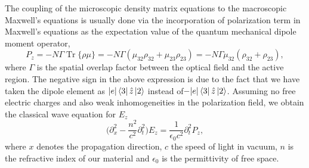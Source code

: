 \documentclass[twocolumn,secnumarabic,amssymb, nobibnotes, aps, prd]{revtex4-1}
\DeclareMathOperator{\Tr}{Tr}
\begin{document}
The coupling of the microscopic density matrix equations to the macroscopic Maxwell's equations is usually done via the incorporation of  polarization term in Maxwell's equations as the expectation value of the quantum mechanical dipole moment operator,
\begin{equation} 
P_z = -N\Gamma \Tr\{\rho \mu\} = -N\Gamma(\mu_{32}\rho_{32} + \mu_{23}\rho_{23}) =  -N\Gamma\mu_{32}(\rho_{32}+\rho_{23}) , \label{eq:fullpolarization}
\end{equation}
where $\Gamma$ is the spatial overlap factor between the optical field  and the active region. The negative sign in the above expression is due to the fact that we have taken the dipole element as $|e| \Bra{3}\hat{z} \Ket{2}$ instead of$-|e| \Bra{3}\hat{z} \Ket{2}$. Assuming no free electric charges and also weak inhomogeneities in the polarization field, we obtain the classical wave equation for  $E_z$
\begin{equation}
\Big (\partial^2_{x} -\frac{n^2}{c^2}\partial^2_{t} \Big) E_z = \frac{1}{\epsilon_0 c^2}\partial^2_t P_z, 
\label{eq:fullwave}
\end{equation}
where $x$ denotes the propagation direction, $c$ the speed of light in vacuum, $n$ is the refractive index of our material and $\epsilon_0$ is the permittivity of free space.
\end{document}
